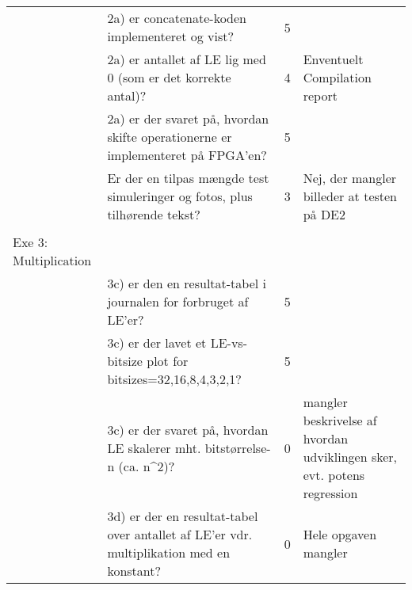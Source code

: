 \begin{table}[h]
\begin{tabularx}{\textwidth}{p{3.5cm}Xp{5mm}X}
                                              & 2a) er concatenate-koden implementeret og vist?                                                     & 5 &                                                                                    \\
                                              & 2a) er antallet af LE lig med 0 (som er det korrekte antal)?                                        & 4 & Enventuelt Compilation report                                                                             \\
                                              & 2a) er der svaret på, hvordan skifte operationerne er implementeret på FPGA’en?                     & 5 &                                                               \\
                                              & Er der en tilpas mængde test simuleringer og fotos, plus tilhørende tekst?                          & 3 & Nej, der mangler billeder at testen på DE2                                                       \\
                                              &                                                                                                     &   &                                                                                                         \\\midrule
        Exe 3: Multiplication                 &                                                                                                     &   &                                                                                                         \\
                                              & 3c) er den en resultat-tabel i journalen for forbruget af LE’er?                                    & 5 &                                                                   \\
                                              & 3c) er der lavet et LE-vs-bitsize plot for bitsizes=32,16,8,4,3,2,1?                                & 5 &                                      \\
                                              & 3c) er der svaret på, hvordan LE skalerer mht. bitstørrelse-n (ca. n\textasciicircum{}2)?           & 0 & mangler beskrivelse af hvordan udviklingen sker, evt. potens regression                                                                         \\
                                              & 3d) er der en resultat-tabel over antallet af LE’er vdr. multiplikation med en konstant?            & 0 & Hele opgaven mangler \\

\end{tabularx}
\end{table}
